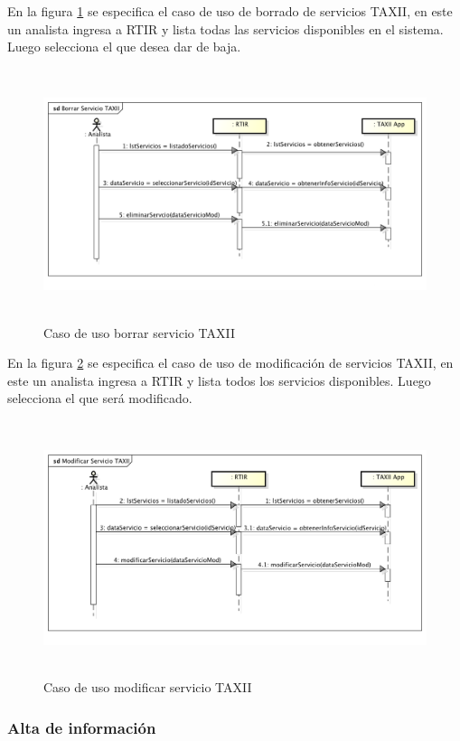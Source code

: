 	En la figura \ref{fig.borradoserviciotaxii} se especifica el caso de uso de borrado de servicios TAXII, en este un analista ingresa a RTIR y lista
	todas las servicios disponibles en el sistema. Luego selecciona el que desea dar de baja.
\begin{figure}[H]
	\centering
	\includegraphics[width=5.7634in,height=2.898in]{Analisis22-img/Analisis22-img024.png} 
	\caption{Caso de uso borrar	servicio TAXII}
	\label{fig.borradoserviciotaxii}
\end{figure}

En la figura \ref{fig.modificarserviciotaxii} se especifica el caso de uso de modificación de servicios TAXII, en este un analista ingresa a RTIR y
lista todos los servicios disponibles. Luego selecciona el que será modificado.

\begin{figure}[H]
	\centering
	\includegraphics[width=5.7638in,height=2.9366in]{Analisis22-img/Analisis22-img025.png} 
	\caption{Caso de uso modificar servicio TAXII}
	\label{fig.modificarserviciotaxii}
\end{figure}

\subsubsection{Alta de información}

